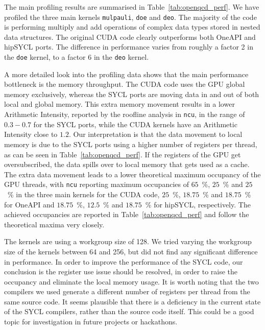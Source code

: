 \documentclass[../main]{subfiles}
\begin{document}
The main profiling results are summarised in Table~\ref{tab:openqcd_perf}.
We have profiled the three main kernels \texttt{mulpauli}, \texttt{doe} and \texttt{deo}.
The majority of the code is performing multiply and add operations of complex data types stored in nested data structures.
The original CUDA code clearly outperforms both OneAPI and hipSYCL ports.
The difference in performance varies from roughly a factor 2 in the \texttt{doe} kernel, to a factor 6 in the \texttt{deo} kernel.

A more detailed look into the profiling data shows that the main performance bottleneck is the memory throughput.
The CUDA code uses the GPU global memory exclusively, whereas the SYCL ports are moving data in and out of both local and global memory.
This extra memory movement results in a lower Arithmetic Intensity, reported by the roofline analysis in \texttt{ncu}, in the range of $0.3 - 0.7$ for the SYCL ports, while the CUDA kernels have an Arithmetic Intensity close to $1.2$.
Our interpretation is that the data movement to local memory is due to the SYCL ports using a higher number of registers per thread, as can be seen in Table~\ref{tab:openqcd_perf}.
If the registers of the GPU get oversubscribed, the data spills over to local memory that gets used as a cache.
The extra data movement leads to a lower theoretical maximum occupancy of the GPU threads, with \texttt{ncu} reporting maximum occupancies of $65$~\%, $25$~\% and $25$~\% in the three main kernels for the CUDA code, $25$~\%, $18.75$~\% and $18.75$~\% for OneAPI and $18.75$~\%, $12.5$~\% and $18.75$~\% for hipSYCL, respectively.
The achieved occupancies are reported in Table~\ref{tab:openqcd_perf} and follow the theoretical maxima very closely.

The kernels are using a workgroup size of 128.
We tried varying the workgroup size of the kernels between 64 and 256, but did not find any significant difference in performance.
In order to improve the performance of the SYCL code, our conclusion is the register use issue should be resolved, in order to raise the occupancy and eliminate the local memory usage.
It is worth noting that the two compilers we used generate a different number of registers per thread from the same source code.
It seems plausible that there is a deficiency in the current state of the SYCL compilers, rather than the source code itself.
This could be a good topic for investigation in future projects or hackathons.
\end{document}
